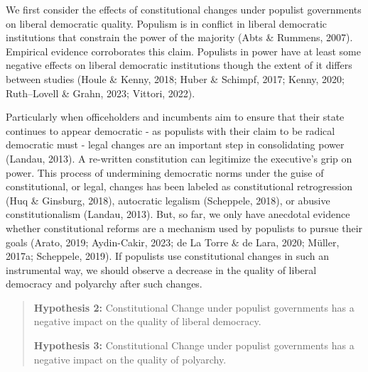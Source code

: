 \documentclass[
  abstract]{article}
\begin{document}
We first consider the effects of constitutional changes under populist
governments on liberal democratic quality. Populism is in conflict in
liberal democratic institutions that constrain the power of the majority
(Abts \& Rummens, 2007). Empirical evidence corroborates this claim.
Populists in power have at least some negative effects on liberal
democratic institutions though the extent of it differs between studies
(Houle \& Kenny, 2018; Huber \& Schimpf, 2017; Kenny, 2020; Ruth--Lovell
\& Grahn, 2023; Vittori, 2022).

Particularly when officeholders and incumbents aim to ensure that their
state continues to appear democratic - as populists with their claim to
be radical democratic must - legal changes are an important step in
consolidating power (Landau, 2013). A re-written constitution can
legitimize the executive's grip on power. This process of undermining
democratic norms under the guise of constitutional, or legal, changes
has been labeled as constitutional retrogression (Huq \& Ginsburg,
2018), autocratic legalism (Scheppele, 2018), or abusive
constitutionalism (Landau, 2013). But, so far, we only have anecdotal
evidence whether constitutional reforms are a mechanism used by
populists to pursue their goals (Arato, 2019; Aydin-Cakir, 2023; de La
Torre \& de Lara, 2020; Müller, 2017a; Scheppele, 2019). If populists
use constitutional changes in such an instrumental way, we should
observe a decrease in the quality of liberal democracy and polyarchy
after such changes.

\begin{quote}
\textbf{Hypothesis 2:} Constitutional Change under populist governments
has a negative impact on the quality of liberal democracy.

\textbf{Hypothesis 3:} Constitutional Change under populist governments
has a negative impact on the quality of polyarchy.
\end{quote}
\end{document}
